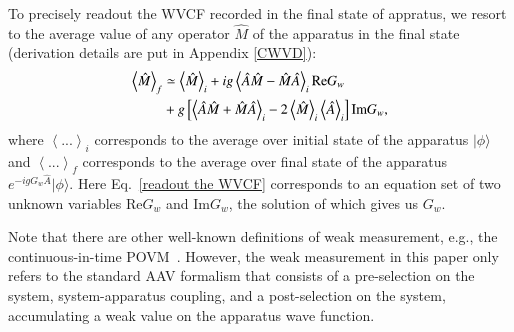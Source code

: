 \documentclass[twocolumn,pra,aps,superscriptaddress]{revtex4-2}
\begin{document}
To precisely readout the WVCF recorded in the final state of appratus, we resort to the average value of any operator $\hat{M}$ of the apparatus in the final state (derivation details are put in Appendix \ref{CWVD}):
\begin{align}\label{readout the WVCF}
\left\langle \hat{M}\right\rangle_f  & \simeq   \left\langle \hat{M}\right\rangle_i +
 ig\left\langle \hat{A}\hat{M}-\hat{M}\hat{A}\right\rangle _{i}\text{Re}G_w\notag
 \\&+g\left[\left\langle \hat{A}\hat{M}+\hat{M}\hat{A}\right\rangle _{i}-2\left\langle \hat{M}\right\rangle _{i}\left\langle \hat{A}\right\rangle _{i}\right]\text{Im}G_w,
\end{align}
where $\left\langle...\right\rangle_i$ corresponds to the average over initial state of the apparatus $|\phi\rangle$ and $\left\langle...\right\rangle_f$ corresponds to the average over final state of the apparatus $e^{-igG_w\hat{A}} |\phi\rangle$. Here Eq.~\eqref{readout the WVCF} corresponds to an equation set of two unknown variables $\text{Re}G_w$ and $\text{Im}G_w$, the solution of which gives us $G_w$.


Note that there are other well-known definitions of weak measurement, e.g., the continuous-in-time POVM~\cite{korotkov2001,jacobs2006}. However, the weak measurement in this paper only refers to the standard AAV formalism that consists of a pre-selection on the system, system-apparatus coupling, and a post-selection on the system, accumulating a weak value on the apparatus wave function.
\end{document}
